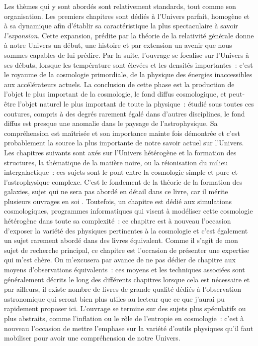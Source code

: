 Les thèmes qui y sont abordés sont relativement standards, tout comme son organisation. Les premiers chapitres sont dédiés à l'Univers parfait, homogène et à sa dynamique afin d'établir sa caractéristique la plus spectaculaire à savoir \textit{l'expansion}. Cette expansion, prédite par la théorie de la relativité générale donne à notre Univers un début, une histoire et par extension un avenir que nous sommes capables de lui prédire. Par la suite, l'ouvrage se focalise sur l'Univers à ses débuts, lorsque les température sont élevées et les densités importantes~: c'est le royaume de la cosmologie primordiale, de la physique des énergies inaccessibles aux accélérateurs actuels. La conclusion de cette phase est la production de l'objet le plus important de la cosmologie, le fond diffus cosmologique, et peut-être l'objet naturel le plus important de toute la physique~: étudié sous toutes ces coutures, compris à des degrés rarement égalé dans d'autres disciplines, le fond diffus est presque une anomalie dans le paysage de l'astrophysique. Sa compréhension est maîtrisée et son importance mainte fois démontrée et c'est probablement la source la plus importante de notre savoir actuel sur l'Univers. Les chapitres suivants sont axés sur l'Univers hétérogène et la formation des structures, la thématique de la matière noire, ou la réionisation du milieu intergalactique~: ces sujets sont le pont entre la cosmologie simple et pure et l'astrophysique complexe. C'est le fondement de la théorie de la formation des galaxies, sujet qui ne sera pas abordé en détail dans ce livre, car il mérite plusieurs ouvrages en soi . Toutefois, un chapitre est dédié aux simulations cosmologiques, programmes informatiques qui visent à modéliser cette cosmologie hétérogène dans toute sa complexité~: ce chapitre est à nouveau l'occasion d'exposer la variété des physiques pertinentes à la cosmologie et c'est également un sujet rarement abordé dans des livres équivalent. Comme il s'agit de mon sujet de recherche principal, ce chapitre est l'occasion de présenter une expertise qui m'est chère. On m'excusera par avance de ne pas dédier de chapitre aux moyens d'observations équivalents~: ces moyens et les techniques associées sont généralement décrits le long des différents chapitres lorsque cela est nécessaire et par ailleurs, il existe nombre de livres de grande qualité dédiés à l'observation astronomique qui seront bien plus utiles au lecteur que ce que j'aurai pu rapidement proposer ici. L'ouvrage se termine sur des sujets plus spéculatifs ou plus abstraits, comme l'inflation ou le rôle de l'entropie en cosmologie~: c'est à nouveau l'occasion de mettre l'emphase sur la variété d'outils physiques qu'il faut mobiliser pour avoir une compréhension de notre Univers.

